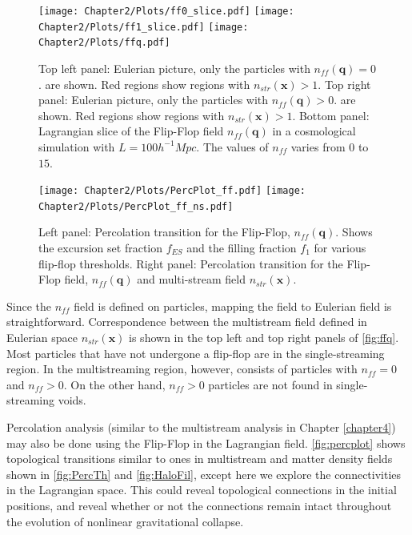 \begin{figure}
\begin{minipage}[t]{.99\linewidth}
\centering\texttt{[image: Chapter2/Plots/ff0\_slice.pdf]} 
\centering\texttt{[image: Chapter2/Plots/ff1\_slice.pdf]} 
 \centering\texttt{[image: Chapter2/Plots/ffq.pdf]} 
\end{minipage}\hfill
\caption{Top left panel: Eulerian picture, only the particles with $n_{ff}(\mathbf{q}) = 0$. are shown. Red regions show regions with $n_{str}(\mathbf{x}) > 1$. Top right panel: Eulerian picture, only the particles with $n_{ff}(\mathbf{q}) > 0$. are shown. Red regions show regions with $n_{str}(\mathbf{x}) > 1$. Bottom panel: Lagrangian slice of the Flip-Flop field $n_{ff}(\mathbf{q})$ in a cosmological simulation with $L = 100 h^{-1} Mpc$. The values of $n_{ff}$ varies from $0$ to $15$.}
\label{fig:ffq}
\end{figure}


\begin{figure}
\begin{minipage}[t]{.99\linewidth}
 \centering\texttt{[image: Chapter2/Plots/PercPlot\_ff.pdf]} 
  \centering\texttt{[image: Chapter2/Plots/PercPlot\_ff\_ns.pdf]}  
\end{minipage}\hfill
\caption{Left panel: Percolation transition for the Flip-Flop, $n_{ff}(\mathbf{q})$. Shows the excursion set fraction $f_{ES}$ and the filling fraction $f_1$ for various flip-flop thresholds. Right panel: Percolation transition for the Flip-Flop field, $n_{ff}(\mathbf{q})$ and multi-stream field $n_{str}(\mathbf{x})$.}
\label{fig:percplot}
\end{figure}



Since the $n_{ff}$ field is defined on particles, mapping the field to Eulerian field is straightforward. Correspondence between the multistream field defined in Eulerian space $n_{str}(\mathbf{x})$ is shown in the top left and top right panels of \autoref{fig:ffq}. Most particles that have not undergone a flip-flop are in the single-streaming region. In the multistreaming region, however, consists of particles with $n_{ff} = 0$ and $n_{ff} > 0$. On the other hand, $n_{ff} > 0$ particles are not found in single-streaming voids. 

Percolation analysis (similar to the multistream analysis in Chapter \ref{chapter4}) may also be done using the Flip-Flop in the Lagrangian field. \autoref{fig:percplot} shows topological transitions similar to ones in multistream and matter density fields shown in \autoref{fig:PercTh} and \autoref{fig:HaloFil}, except here we explore the connectivities in the Lagrangian space. This could reveal topological connections in the initial positions, and reveal whether or not the connections remain intact throughout the evolution of nonlinear gravitational collapse. 


